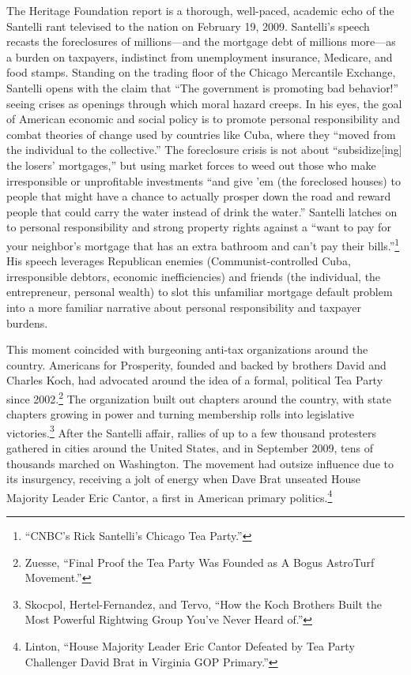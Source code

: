 \documentclass[
]{article}
\begin{document}
The Heritage Foundation report is a thorough, well-paced, academic echo of the Santelli rant televised to the nation on February 19, 2009.
Santelli's speech recasts the foreclosures of millions---and the mortgage debt of millions more---as a burden on taxpayers, indistinct from unemployment insurance, Medicare, and food stamps.
Standing on the trading floor of the Chicago Mercantile Exchange, Santelli opens with the claim that ``The government is promoting bad behavior!'' seeing crises as openings through which moral hazard creeps.
In his eyes, the goal of American economic and social policy is to promote personal responsibility and combat theories of change used by countries like Cuba, where they ``moved from the individual to the collective.''
The foreclosure crisis is not about ``subsidize{[}ing{]} the losers' mortgages,'' but using market forces to weed out those who make irresponsible or unprofitable investments ``and give 'em (the foreclosed houses) to people that might have a chance to actually prosper down the road and reward people that could carry the water instead of drink the water.''
Santelli latches on to personal responsibility and strong property rights against a ``want to pay for your neighbor's mortgage that has an extra bathroom and can't pay their bills.''\footnote{``CNBC's Rick Santelli's Chicago Tea Party.''}
His speech leverages Republican enemies (Communist-controlled Cuba, irresponsible debtors, economic inefficiencies) and friends (the individual, the entrepreneur, personal wealth) to slot this unfamiliar mortgage default problem into a more familiar narrative about personal responsibility and taxpayer burdens.

This moment coincided with burgeoning anti-tax organizations around the country.
Americans for Prosperity, founded and backed by brothers David and Charles Koch, had advocated around the idea of a formal, political Tea Party since 2002.\footnote{Zuesse, ``Final Proof the Tea Party Was Founded as A Bogus AstroTurf Movement.''}
The organization built out chapters around the country, with state chapters growing in power and turning membership rolls into legislative victories.\footnote{Skocpol, Hertel-Fernandez, and Tervo, ``How the Koch Brothers Built the Most Powerful Rightwing Group You've Never Heard of.''}
After the Santelli affair, rallies of up to a few thousand protesters gathered in cities around the United States, and in September 2009, tens of thousands marched on Washington.
The movement had outsize influence due to its insurgency, receiving a jolt of energy when Dave Brat unseated House Majority Leader Eric Cantor, a first in American primary politics.\footnote{Linton, ``House Majority Leader Eric Cantor Defeated by Tea Party Challenger David Brat in Virginia GOP Primary.''}
\end{document}
